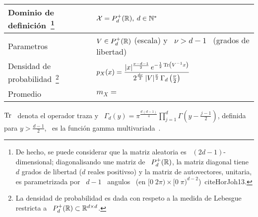 \begin{center}
\begin{tabular}
{
|>{\vspace{-2mm}}p{}|
>{\vspace{-2mm}\hspace{2mm}}p{}|
}
%
\hline
%
Dominio de definici\'on~\footnote{De hecho, se puede considerar que la matriz
aleatoria es \ $(2 d - 1)$-dimensional; diagonalisando une matriz de \
$P_d^+(\mathbb{R})$, la matriz diagonal tiene $d$ grados de libertad ($d$ reales
positivso) y la matriz de autovectores, unitaria, es parametrizada por \ $d-1$ \
angulos \ (en $[0 \; 2 \pi) \times [0 \;
\pi)^{d-2}$)~cite{HorJoh13}.\label{Foot:MP:WishartXtilde}} & $\mathcal{X} =
P_d^+(\mathbb{R}), \: d \in \mathbb{N}^*$\\[2mm]
\hline
%
Parametros & $V \in  P_d^+(\mathbb{R})$ (escala) y \ $\nu > d-1$ \ (grados de libertad)\\[2mm]
\hline
Densidad de probabilidad~\footnote{La densidad de probabilidad es dada con
respeto a la medida de Lebesgue restricta a \ $P_d^+(\mathbb{R}) \subset \mathbb{R}^{d
\times d}$.\label{Foot:MP:WishartDensidad}} & $\displaystyle p_X(x) =
\frac{|x|^{\frac{\nu-d-1}{2}} \, e^{-\frac12 \operatorname{Tr}\left( V^{-1}
x\right)}}{2^{\frac{d \nu}{2}} \, |V|^{\frac{\nu}{2}} \, \Gamma_d\left(
\frac{\nu}{2} \right)}$\\[2mm]
\hline
Promedio & $\displaystyle m_X = $\\[2mm]
\hline
\end{tabular}
\end{center}
%
$\operatorname{Tr}$ \ denota  el operador traza y \ $\Gamma_d(y)  = \pi^{\frac{d \, (d-1)}{4}}
\prod_{j=1}^d  \Gamma\left(  y -  \frac{j-1}{2}  \right)$,  definida  para $y  >
\frac{d-1}{2}$, \ es la funci\'on gamma multivariada~\cite{toto}.

